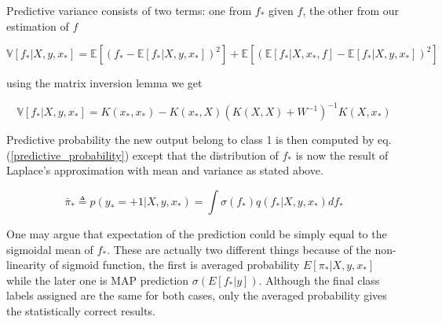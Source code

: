 \documentclass[14pt]{report}
\numberwithin{equation}{chapter}
\begin{document}
\begin{spacing}{2}
Predictive variance consists of two terms: one from $f_\ast$ given $f$, the other from our estimation of $f$

\begin{equation}
\label{predictive_var_classification}
\mathbb{V}[f_\ast|X,y,x_\ast] = \mathbb{E}[(f_\ast - \mathbb{E}[f_\ast|X,y,x_\ast])^2] + \mathbb{E}[(\mathbb{E}[f_\ast|X,x_\ast,f] - \mathbb{E}[f_\ast|X,y,x_\ast])^2]
\end{equation}

using the matrix inversion lemma\cite{woodbury1950inverting} we get

\begin{equation}
\mathbb{V}[f_\ast|X,y,x_\ast] = K(x_\ast,x_\ast) - K(x_\ast,X)(K(X,X) + W^{-1})^{-1}K(X,x_\ast)
\end{equation}

Predictive probability the new output belong to class 1 is then computed by eq. (\ref{predictive_probability}) except that the distribution of $f_\ast$ is now the result of Laplace's approximation with mean and variance as stated above. 

\begin{equation}
\bar{\pi}_* \triangleq p(y_* = +1|X,y,x_*) = \int \sigma (f_*)q(f_*|X,y,x_*) df_*
\end{equation}

One may argue that expectation of the prediction could be simply equal to the sigmoidal mean of $f_*$. These are actually two different things because of the non-linearity of sigmoid function, the first is averaged probability $E[\pi_*|X,y,x_*]$ while the later one is MAP prediction $\sigma (E[f_*|y])$. Although the final class labels assigned are the same for both cases, only the averaged probability gives the statistically correct results. 

\begin{figure}


\end{figure}
\end{spacing}
\end{document}
